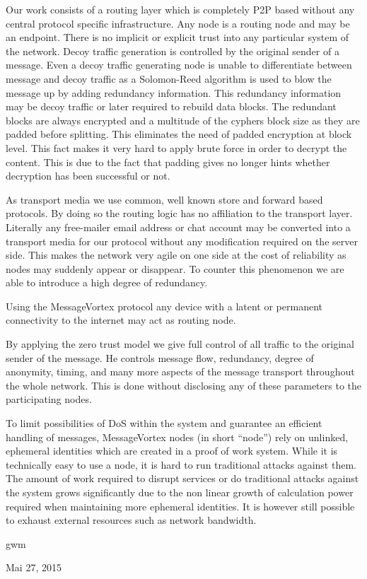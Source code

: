 \documentclass[9pt,journal,compsoc]{IEEEtran}
\begin{document}
Our work consists of a routing layer which is completely P2P based without any central protocol specific infrastructure. Any node is a routing node and may be an endpoint. There is no implicit or explicit trust into any particular system of the  network. Decoy traffic generation is controlled by the original sender of a message. Even a decoy traffic generating node is unable to differentiate between message and decoy traffic as a Solomon-Reed algorithm is used to blow the message up by adding redundancy information. This redundancy information may be decoy traffic or later required to rebuild data blocks. The redundant blocks are always encrypted and a multitude of the cyphers block size as they are padded before splitting. This eliminates the need of padded encryption at block level. This fact makes it very hard to apply brute force in order to decrypt the content. This is due to the fact  that padding gives no longer hints whether decryption has been successful or not.

As transport media we use common, well known store and forward based protocols. By doing so the routing logic has no affiliation to the transport layer. Literally any free-mailer email address or chat account may be converted into a transport media for our protocol without any modification required on the server side. This makes the network very agile on one side at the cost of reliability as nodes may suddenly appear or disappear. To counter this phenomenon we are able to introduce a high degree of redundancy.

Using the MessageVortex protocol any device with a latent or permanent connectivity to the internet may act as routing node. 

By applying the zero trust model we give full control of all traffic to the original sender of the message. He controls message flow, redundancy, degree of anonymity, timing, and many more aspects of the message transport throughout the whole network. This is done without disclosing any of these parameters to the participating nodes.

To limit possibilities of DoS within the system and guarantee an efficient handling of messages, MessageVortex nodes (in short ``node'') rely on unlinked, ephemeral identities which are created in a proof of work system. While it is technically easy to use a node, it is hard to run traditional attacks against them. The amount of work required to disrupt services or do traditional attacks against the system grows significantly due to the non linear growth of calculation power required when maintaining more ephemeral identities. It is however still possible to exhaust external resources such as network bandwidth.\par\nopagebreak
\ifCLASSOPTIONpeerreview
\else
\hfill gwm\par\nopagebreak
\hfill Mai 27, 2015
\fi
\end{document}
